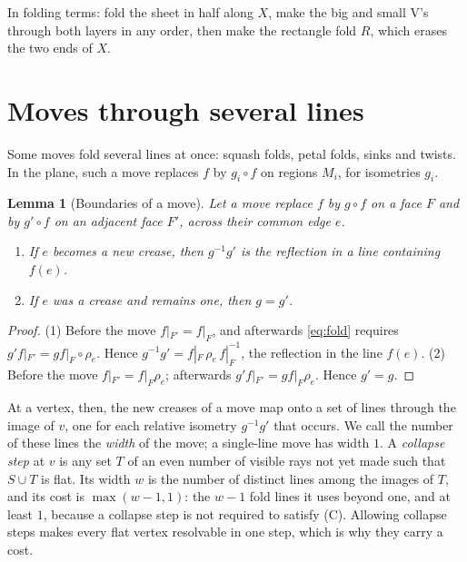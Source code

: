 \documentclass[11pt]{article}
\newtheorem{lemma}[theorem]{Lemma}
\theoremstyle{definition}
\theoremstyle{remark}
\begin{document}
In folding terms: fold the sheet in half along $X$, make the big and small V's through both layers in any order, then make the rectangle fold $R$, which erases the two ends of $X$.

\section{Moves through several lines}\label{sec:collapse}

Some moves fold several lines at once: squash folds, petal folds, sinks and twists. In the plane, such a move replaces $f$ by $g_i\circ f$ on regions $M_i$, for isometries $g_i$.

\begin{lemma}[Boundaries of a move]\label{lem:multiboundary}
Let a move replace $f$ by $g\circ f$ on a face $F$ and by $g'\circ f$ on an adjacent face $F'$, across their common edge $e$.
\begin{enumerate}
\item If $e$ becomes a new crease, then $g^{-1}g'$ is the reflection in a line containing $f(e)$.
\item If $e$ was a crease and remains one, then $g=g'$.
\end{enumerate}
\end{lemma}

\begin{proof}
(1) Before the move $f|_{F'}=f|_F$, and afterwards \eqref{eq:fold} requires $g'f|_{F'}=gf|_F\circ\rho_e$. Hence $g^{-1}g'=f|_F\,\rho_e\,f|_F^{-1}$, the reflection in the line $f(e)$. (2) Before the move $f|_{F'}=f|_F\rho_e$; afterwards $g'f|_{F'}=gf|_F\rho_e$. Hence $g'=g$.
\end{proof}

At a vertex, then, the new creases of a move map onto a set of lines through the image of $v$, one for each relative isometry $g^{-1}g'$ that occurs. We call the number of these lines the \emph{width} of the move; a single-line move has width $1$. A \emph{collapse step} at $v$ is any set $T$ of an even number of visible rays not yet made such that $S\cup T$ is flat. Its width $w$ is the number of distinct lines among the images of $T$, and its cost is $\max(w-1,1)$: the $w-1$ fold lines it uses beyond one, and at least $1$, because a collapse step is not required to satisfy (C). Allowing collapse steps makes every flat vertex resolvable in one step, which is why they carry a cost.
\end{document}
